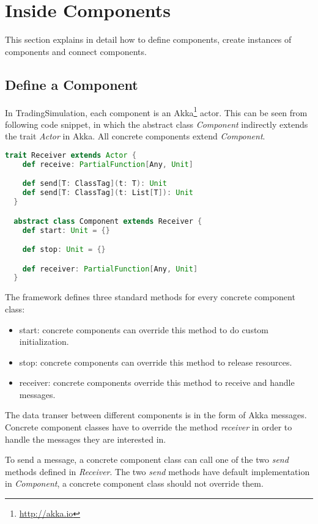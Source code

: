 \section{Inside Components}
\label{sec:2}

This section explains in detail how to define components, create instances of components and connect components.

\subsection{Define a Component}

In TradingSimulation, each component is an Akka\footnote{\url{http://akka.io}} actor. This can be seen from following code snippet, in which the abstract class \emph{Component} indirectly extends the trait \emph{Actor} in Akka. All concrete components extend \emph{Component}.

\begin{lstlisting}[language=Scala]
  trait Receiver extends Actor {
    def receive: PartialFunction[Any, Unit]

    def send[T: ClassTag](t: T): Unit
    def send[T: ClassTag](t: List[T]): Unit
  }

  abstract class Component extends Receiver {
    def start: Unit = {}

    def stop: Unit = {}

    def receiver: PartialFunction[Any, Unit]
  }
\end{lstlisting}

The framework defines three standard methods for every concrete component class:

\begin{itemize}
\item{start}: concrete components can override this method to do custom initialization.
\item{stop}: concrete components can override this method to release resources.
\item{receiver}: concrete components override this method to receive and handle messages.
\end{itemize}

The data transer between different components is in the form of Akka messages. Concrete component classes have to override the method \emph{receiver} in order to handle the messages they are interested in.

To send a message, a concrete component class can call one of the two \emph{send} methods defined in \emph{Receiver}. The two \emph{send} methods have default implementation in \emph{Component}, a concrete component class should not override them.

